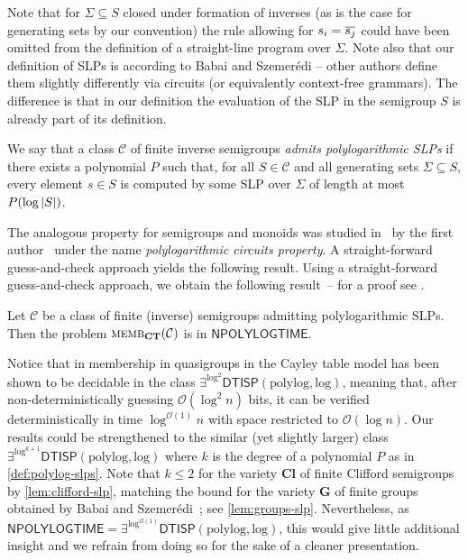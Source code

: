 \documentclass[anonymous,letter,UKenglish,cleveref,autoref,thm-restate]{lipics-v2021}
\renewcommand{\leq}{\leqslant}
\newcommand{\sse}{\subseteq}
\newcommand{\abs}[1] {\ensuremath\left|#1\right|}
\newcommand{\bigO}{\mathcal{O}}
\newcommand{\NPOLYLOGTIME}{\ensuremath{\mathsf{NPOLYLOGTIME}}\xspace}
\newcommand{\vG}{\ensuremath{\mathbf{G}}}
\newcommand{\vCl}{\ensuremath{\mathbf{Cl}}}
\newcommand\nindent{.5pt}
\newcommand\noverline[1]{\kern\nindent\overline{\kern-\nindent#1\kern-\nindent}\kern\nindent}
\newcommand{\ov}[1]{\noverline{#1}}
\newcommand{\cC}{\mathcal{C}}
\theoremstyle{plain}
\theoremstyle{plain}
\newcommand{\dMemb}[2][]{\textup{\textsc{memb${}_{\mathbf{#1}}\expandafter\ifx\expandafter\relax\detokenize{#2}\relax\else(#2)\fi$}}}
\begin{document}
Note that for $\Sigma \sse S$ closed under formation of inverses (as is the case for generating sets by our convention) the rule allowing for $s_i = \ov{s_j}$ could have been omitted from the definition of a straight-line program over $\Sigma$.
Note also that our definition of SLPs is according to Babai and Szemer\'edi \cite{BabaiS84} -- other authors define them slightly differently via circuits (or equivalently context-free grammars). The difference is that in our definition the evaluation of the SLP in the semigroup $S$ is already part of its definition.



\begin{definition}\label{def:polylog-slps}
  We say that a class $\cC$ of finite inverse semigroups \emph{admits polylogarithmic SLPs} if there exists a polynomial $P$ such that, for all $S \in \cC$ and all generating sets $\Sigma \subseteq S$, every element $s \in S$ is computed by some SLP over $\Sigma$ of length at most $P(\log \abs{S})$.
\end{definition}

The analogous property for semigroups and monoids was studied \ifAnonimous in~\cite{Fleischer22,Fleischer19diss}
\else by the first author~\cite{Fleischer22,Fleischer19diss}
\fi
 under the name \emph{polylogarithmic circuits property}. 
\ifAnonimous
A straight-forward guess-and-check approach yields the following result.
\else Using a straight-forward guess-and-check approach, we obtain the following result~-- for a proof see \cite[Corollary 5.2]{Fleischer19diss}.
\fi

\begin{lemma}\label{lem:SLP-npolylogtime}
  Let $\cC$ be a class of finite (inverse) semigroups admitting polylogarithmic SLPs.
  Then the problem $\dMemb[CT]{\cC}$ is in $\NPOLYLOGTIME$.
\end{lemma}


\begin{remark}
	Notice that in \cite{CollinsGLW24arxiv}	membership in quasigroups in the Cayley table model has been shown to be decidable in the class $\exists^{\log^2}\mathsf{DTISP}(\mathrm{polylog}, \mathrm{log})$, meaning that, after non-deterministically guessing $\bigO(\log^2 n)$ bits, it can be verified  deterministically in time $\log^{\bigO(1)} n$ with space restricted to $\bigO(\log n)$. 
	Our results could be strengthened to the similar (yet slightly larger) class $\exists^{\log^{k+1}}\mathsf{DTISP}(\mathrm{polylog}, \mathrm{log})$ where $k$ is the degree of a polynomial $P$ as in \cref{def:polylog-slps}.
  Note that $k \leq 2$ for the variety $\vCl$ of finite Clifford semigroups by \cref{lem:clifford-slp}, matching the bound for the variety $\vG$ of finite groups obtained by Babai and Szemer\'edi~\cite{BabaiS84}; see \cref{lem:groups-slp}.
	Nevertheless, as $\NPOLYLOGTIME = \exists^{\log^{\bigO(1)}}\mathsf{DTISP}(\mathrm{polylog}, \mathrm{log})$, this would give little additional insight and we refrain from doing so for the sake of a cleaner presentation.
\end{remark}
\end{document}
